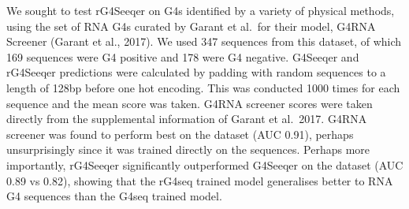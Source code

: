 \documentclass[12pt,a4paper,]{report}
\begin{document}
\newpage

We sought to test rG4Seeqer on G4s identified by a variety of physical
methods, using the set of RNA G4s curated by Garant et al.~for their
model, G4RNA Screener (Garant et al., 2017). We used 347 sequences from
this dataset, of which 169 sequences were G4 positive and 178 were G4
negative. G4Seeqer and rG4Seeqer predictions were calculated by padding
with random sequences to a length of 128bp before one hot encoding. This
was conducted 1000 times for each sequence and the mean score was taken.
G4RNA screener scores were taken directly from the supplemental
information of Garant et al.~2017. G4RNA screener was found to perform
best on the dataset (AUC 0.91), perhaps unsurprisingly since it was
trained directly on the sequences. Perhaps more importantly, rG4Seeqer
significantly outperformed G4Seeqer on the dataset (AUC 0.89 vs 0.82),
showing that the rG4seq trained model generalises better to RNA G4
sequences than the G4seq trained model.

\newpage
\end{document}
